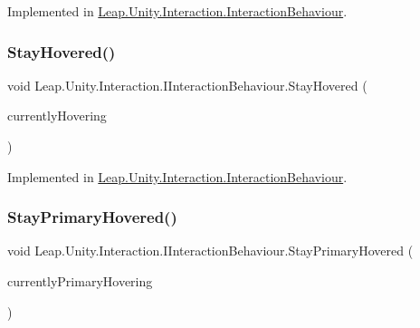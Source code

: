 Implemented in \mbox{\hyperlink{class_leap_1_1_unity_1_1_interaction_1_1_interaction_behaviour_a47f9dce836cf928f2cb6885547f7afa8}{Leap.\+Unity.\+Interaction.\+Interaction\+Behaviour}}.

\mbox{\label{interface_leap_1_1_unity_1_1_interaction_1_1_i_interaction_behaviour_ab9d088c65012161b3df47f3057d07e5a}} 
\subsubsection{\texorpdfstring{StayHovered()}{StayHovered()}}
{\footnotesize\ttfamily void Leap.\+Unity.\+Interaction.\+I\+Interaction\+Behaviour.\+Stay\+Hovered (\begin{DoxyParamCaption}\item[{List$<$ \mbox{\hyperlink{class_leap_1_1_unity_1_1_interaction_1_1_interaction_controller}{Interaction\+Controller}} $>$}]{currently\+Hovering }\end{DoxyParamCaption})}



Implemented in \mbox{\hyperlink{class_leap_1_1_unity_1_1_interaction_1_1_interaction_behaviour_a7f9fb570739d3cc9047356abbe21bc44}{Leap.\+Unity.\+Interaction.\+Interaction\+Behaviour}}.

\mbox{\label{interface_leap_1_1_unity_1_1_interaction_1_1_i_interaction_behaviour_ac761f52208454fe568478d317e6431b2}} 
\subsubsection{\texorpdfstring{StayPrimaryHovered()}{StayPrimaryHovered()}}
{\footnotesize\ttfamily void Leap.\+Unity.\+Interaction.\+I\+Interaction\+Behaviour.\+Stay\+Primary\+Hovered (\begin{DoxyParamCaption}\item[{List$<$ \mbox{\hyperlink{class_leap_1_1_unity_1_1_interaction_1_1_interaction_controller}{Interaction\+Controller}} $>$}]{currently\+Primary\+Hovering }\end{DoxyParamCaption})}



